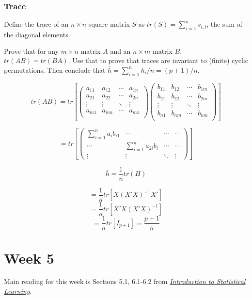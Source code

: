 \documentclass[
  letterpaper,
  DIV=11,
  numbers=noendperiod]{scrreport}
\begin{document}
\hypertarget{trace}{%
\subsection{Trace}\label{trace}}

Define the trace of an \(n \times n\) square matrix \(S\) as
\(tr(S)= \sum_{i=1}^n s_{i,i}\), the sum of the diagonal elements.

Prove that for any \(m \times n\) matrix \(A\) and an \(n \times m\)
matrix \(B\), \(tr(AB) = tr(BA)\). Use that to prove that traces are
invariant to (finite) cyclic permutations. Then conclude that
\(\bar h = \sum_{i=1}^n h_i/n = (p+1)/n\).

\[tr(AB) = tr\left[ 
\begin{pmatrix}
a_{11} & a_{12} & \cdots & a_{1n} \\ 
a_{21} & a_{22} & \cdots & a_{2n} \\ 
\vdots & \vdots & \ddots & \vdots \\ 
a_{m1} & a_{mn} & \cdots & a_{mn} \\ 
\end{pmatrix} 
\begin{pmatrix}
b_{11} & b_{12} & \cdots & b_{1m} \\ 
b_{21} & b_{22} & \cdots & b_{2m} \\ 
\vdots & \vdots & \ddots & \vdots \\ 
b_{n1} & b_{nm} & \cdots & b_{nm} \\ 
\end{pmatrix} 
\right]\]

\[
= tr\left[ 
\begin{pmatrix}
\sum_{i=1}^n a_i b_{i1} & \cdots & \cdots & \cdots \\ 
\cdots & \sum_{i=1}^n a_{2i} b_i & \cdots & \cdots \\ 
\vdots & \vdots & \ddots & \vdots 
\end{pmatrix}
\right]\]

\[ \bar h = \frac{1}{n} tr(H)\]

\[ = \frac{1}{n} tr[X(X'X)^{-1}X']\]
\[ = \frac{1}{n} tr[X'X(X'X)^{-1}]\]
\[ = \frac{1}{n} tr[I_{p+1}] = \frac{p+1}{n}\]


\hypertarget{week-5}{%
\chapter{Week 5}\label{week-5}}

Main reading for this week is Sections 5.1, 6.1-6.2 from
\href{https://trevorhastie.github.io/ISLR/}{\emph{Introduction to
Statistical Learning}}.
\end{document}
